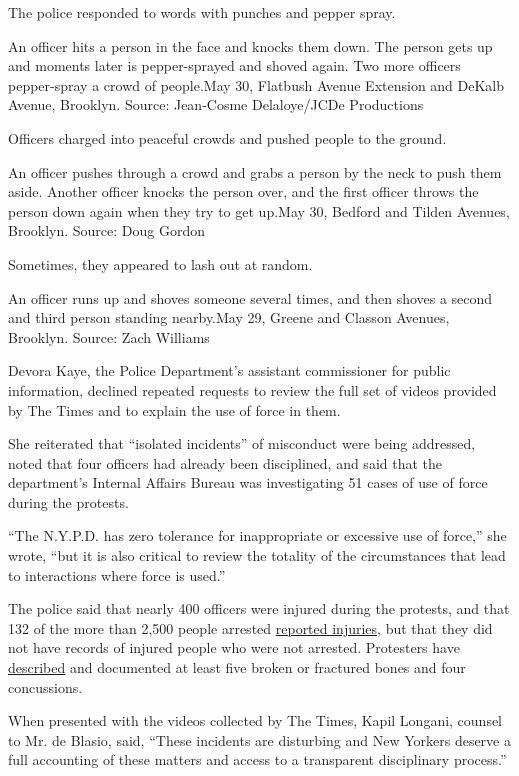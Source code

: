 The police responded to words with punches and pepper spray.

An officer hits a person in the face and knocks them down. The person
gets up and moments later is pepper-sprayed and shoved again. Two more
officers pepper-spray a crowd of people.May 30, Flatbush Avenue
Extension and DeKalb Avenue, Brooklyn. Source: Jean-Cosme Delaloye/JCDe
Productions

Officers charged into peaceful crowds and pushed people to the ground.

An officer pushes through a crowd and grabs a person by the neck to push
them aside. Another officer knocks the person over, and the first
officer throws the person down again when they try to get up.May 30,
Bedford and Tilden Avenues, Brooklyn. Source: Doug Gordon

Sometimes, they appeared to lash out at random.

An officer runs up and shoves someone several times, and then shoves a
second and third person standing nearby.May 29, Greene and Classon
Avenues, Brooklyn. Source: Zach Williams

Devora Kaye, the Police Department's assistant commissioner for public
information, declined repeated requests to review the full set of videos
provided by The Times and to explain the use of force in them.

She reiterated that ``isolated incidents'' of misconduct were being
addressed, noted that four officers had already been disciplined, and
said that the department's Internal Affairs Bureau was investigating 51
cases of use of force during the protests.

``The N.Y.P.D. has zero tolerance for inappropriate or excessive use of
force,'' she wrote, ``but it is also critical to review the totality of
the circumstances that lead to interactions where force is used.''

The police said that nearly 400 officers were injured during the
protests, and that 132 of the more than 2,500 people arrested
\href{https://www.newsday.com/news/new-york/nypd-funding-de-blasio-george-floyd-protests-1.45468714}{reported
injuries}, but that they did not have records of injured people who were
not arrested. Protesters have
\href{https://gothamist.com/news/nypd-protest-violence-victims-in-their-own-words}{described}
and documented at least five broken or fractured bones and four
concussions.

When presented with the videos collected by The Times, Kapil Longani,
counsel to Mr. de Blasio, said, ``These incidents are disturbing and New
Yorkers deserve a full accounting of these matters and access to a
transparent disciplinary process.''

